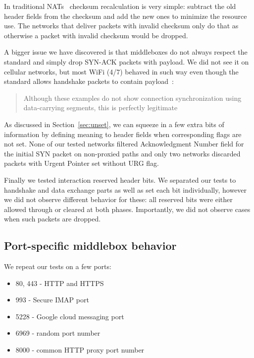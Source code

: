 \documentclass{sig-alternate-10pt}
\begin{document}
In traditional NATs~\cite{Egevang:tu} checksum recalculation is very simple: subtract the old header fields from the checksum and add the new ones to minimize the resource use. The networks that deliver packets with invalid checksum only do that as otherwise a packet with invalid checksum would be dropped.

A bigger issue we have discovered is that middleboxes do not always respect the standard and simply drop SYN-ACK packets with payload. We did not see it on cellular networks, but most WiFi (4/7) behaved in such way even though the standard allows handshake packets to contain payload~\cite{Postel:3EDyoxP_,Chu:2011tn}:

\begin{quotation}
    Although these examples do not show connection synchronization using data-carrying segments, this is perfectly legitimate
\end{quotation}

As discussed in Section~\ref{sec:unset}, we can squeeze in a few extra bits of information by defining meaning to header fields when corresponding flags are not set. None of our tested networks filtered Acknowledgment Number field for the initial SYN packet on non-proxied paths and only two networks discarded packets with Urgent Pointer set without URG flag.

Finally we tested interaction reserved header bits. We separated our tests to handshake and data exchange parts as well as set each bit individually, however we did not observe different behavior for these: all reserved bits were either allowed through or cleared at both phases. Importantly, we did not observe cases when such packets are dropped.


\subsection{Port-specific middlebox behavior}
\label{sec:portspec}

We repeat our tests on a few ports:
\begin{itemize}
    \item 80, 443 - HTTP and HTTPS
    \item 993 - Secure IMAP port
    \item 5228 - Google cloud messaging port
    \item 6969 - random port number
    \item 8000 - common HTTP proxy port number
\end{itemize}
\end{document}
